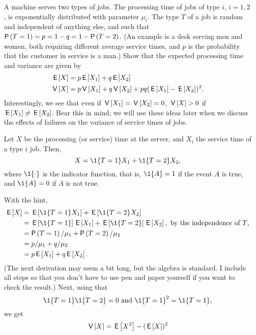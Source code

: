 \begin{extra}\label{ex:49}
  A machine serves two types of jobs. The processing time of jobs of
  type $i$, $i=1,2$, is exponentially distributed with parameter
  $\mu_i$. The type $T$ of a job is random and independent of anything
  else, and such that $\P{T=1} = p = 1-q = 1-\P{T=2}$. (An example
  is a desk serving men and women, both requiring different average
  service times, and $p$ is the probability that the customer in
  service is a man.)  Show that  the expected processing time  and  variance are given by
\begin{align*}
  \,\mathsf{E}\left[X\right] &= p \,\mathsf{E}\left[X_1\right]  + q \,\mathsf{E}\left[X_2\right] \\
\,\mathsf{V}\left[X\right] &= p \,\mathsf{V}\left[X_1\right] + q \,\mathsf{V}\left[X_2\right] + pq(\,\mathsf{E}\left[X_1\right] - \,\mathsf{E}\left[X_2\right])^2.
  \end{align*}
Interestingly, we see that even if $\,\mathsf{V}\left[X_1\right] = \,\mathsf{V}\left[X_2\right] = 0$, $\,\mathsf{V}\left[X\right] > 0$
if $\,\mathsf{E}\left[X_1\right] \neq \,\mathsf{E}\left[X_2\right]$. Bear this in mind; we will use these ideas
later when we discuss the effects of failures on the variance of
service times of jobs.
\begin{hint}
    Let $X$ be the processing (or service) time at the server, and
    $X_i$ the service time of a type $i$ job. Then, 
    \begin{equation*}
      X = \1{T=1} X_1 + \1{T=2} X_2,
    \end{equation*}
    where $\1{\cdot}$ is the indicator function, that is, $\1{A}=1$ if the
    event $A$ is true, and $\1{A}=0$ if $A$ is not true.   
\end{hint}
  \begin{solution}
With the hint, 
\begin{align*}
  \E X 
&= \E{\1{T=1} X_1} + \E{\1{T=2} X_2} \\
&= \E{\1{T=1}} \E{ X_1} + \E{\1{T=2}} \E{X_2}, \text{ by the independence of $T$}, \\
&= \P{T=1} /\mu_1 + \P{T=2}/ \mu_2 \\
&= p /\mu_1 + q/ \mu_2 \\
&= p \E{X_1}  + q \E{X_2}.
\end{align*}
(The next derivation may seem a bit long, but the algebra is
standard. I include all steps so that you don't have to use pen and
paper yourself if you want to check the result.) Next, using that
\begin{equation*}
\1{T=1}\1{T=2} = 0 \text{ and } \1{T=1}^2 = \1{T=1},
\end{equation*}
we get
\begin{align*}
  \V X 
&= \E{X^2} - (\E X)^2 \\

\end{align*}
\end{solution}
\end{extra}
